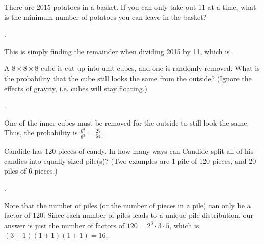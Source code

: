 \documentclass[11pt]{article}
\begin{document}
\begin{problem}
There are 2015 potatoes in a basket. If you can only take out 11 at a time, what is the minimum number of potatoes you can leave in the basket?
\end{problem}

\begin{answer}
.
\end{answer}

\begin{solution}
This is simply finding the remainder when dividing 2015 by 11, which is .
\end{solution}

\begin{problem}
A $8 \times 8 \times 8$ cube is cut up into unit cubes, and one is randomly removed. What is the probability that the cube still looks the same from the outside? (Ignore the effects of gravity, i.e. cubes will stay floating.)
\end{problem}

\begin{answer}
.
\end{answer}

\begin{solution}
One of the inner cubes must be removed for the outside to still look the same. Thus, the probability is $\frac{6^3}{8^3} = \boxed{\frac{27}{64}}$.
\end{solution}

\begin{problem}
Candide has 120 pieces of candy. In how many ways can Candide split all of his candies into equally sized pile(s)? (Two examples are 1 pile of 120 pieces, and 20 piles of 6 pieces.)
\end{problem}

\begin{answer}
.
\end{answer}

\begin{solution}
Note that the number of piles (or the number of pieces in a pile) can only be a factor of 120. Since each number of piles leads to a unique pile distribution, our answer is just the number of factors of $120 = 2^{3}\cdot3\cdot5$, which is $(3+1)(1+1)(1+1) = \boxed{16}$.
\end{solution}
\end{document}
